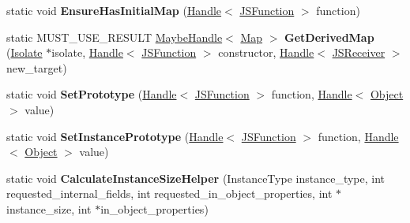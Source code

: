\begin{DoxyCompactItemize}
\item 
static void {\bfseries Ensure\+Has\+Initial\+Map} (\hyperlink{classv8_1_1internal_1_1_handle}{Handle}$<$ \hyperlink{classv8_1_1internal_1_1_j_s_function}{J\+S\+Function} $>$ function)\hypertarget{classv8_1_1internal_1_1_j_s_function_a5ede1c6b434cc020de4d8efdd57498d1}{}\label{classv8_1_1internal_1_1_j_s_function_a5ede1c6b434cc020de4d8efdd57498d1}

\item 
static M\+U\+S\+T\+\_\+\+U\+S\+E\+\_\+\+R\+E\+S\+U\+LT \hyperlink{classv8_1_1internal_1_1_maybe_handle}{Maybe\+Handle}$<$ \hyperlink{classv8_1_1internal_1_1_map}{Map} $>$ {\bfseries Get\+Derived\+Map} (\hyperlink{classv8_1_1internal_1_1_isolate}{Isolate} $\ast$isolate, \hyperlink{classv8_1_1internal_1_1_handle}{Handle}$<$ \hyperlink{classv8_1_1internal_1_1_j_s_function}{J\+S\+Function} $>$ constructor, \hyperlink{classv8_1_1internal_1_1_handle}{Handle}$<$ \hyperlink{classv8_1_1internal_1_1_j_s_receiver}{J\+S\+Receiver} $>$ new\+\_\+target)\hypertarget{classv8_1_1internal_1_1_j_s_function_a948f847285db8c01e99a0a7ae076cbff}{}\label{classv8_1_1internal_1_1_j_s_function_a948f847285db8c01e99a0a7ae076cbff}

\item 
static void {\bfseries Set\+Prototype} (\hyperlink{classv8_1_1internal_1_1_handle}{Handle}$<$ \hyperlink{classv8_1_1internal_1_1_j_s_function}{J\+S\+Function} $>$ function, \hyperlink{classv8_1_1internal_1_1_handle}{Handle}$<$ \hyperlink{classv8_1_1internal_1_1_object}{Object} $>$ value)\hypertarget{classv8_1_1internal_1_1_j_s_function_a8b10c267c842c7c0219ca747585905c0}{}\label{classv8_1_1internal_1_1_j_s_function_a8b10c267c842c7c0219ca747585905c0}

\item 
static void {\bfseries Set\+Instance\+Prototype} (\hyperlink{classv8_1_1internal_1_1_handle}{Handle}$<$ \hyperlink{classv8_1_1internal_1_1_j_s_function}{J\+S\+Function} $>$ function, \hyperlink{classv8_1_1internal_1_1_handle}{Handle}$<$ \hyperlink{classv8_1_1internal_1_1_object}{Object} $>$ value)\hypertarget{classv8_1_1internal_1_1_j_s_function_a4fdcd36b2852be5144d3f8a2d358237c}{}\label{classv8_1_1internal_1_1_j_s_function_a4fdcd36b2852be5144d3f8a2d358237c}

\item 
static void {\bfseries Calculate\+Instance\+Size\+Helper} (Instance\+Type instance\+\_\+type, int requested\+\_\+internal\+\_\+fields, int requested\+\_\+in\+\_\+object\+\_\+properties, int $\ast$instance\+\_\+size, int $\ast$in\+\_\+object\+\_\+properties)\hypertarget{classv8_1_1internal_1_1_j_s_function_a5011ef83b93a953486ea95c193def12c}{}\label{classv8_1_1internal_1_1_j_s_function_a5011ef83b93a953486ea95c193def12c}


\end{DoxyCompactItemize}

